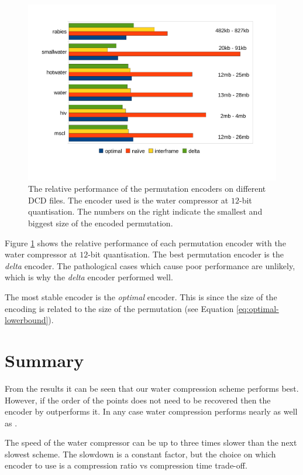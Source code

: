 \documentclass[a4paper]{report}
\begin{document}
\begin{figure}[h]
\centering
\includegraphics[trim = 10mm 30mm 10mm 18mm, clip, width=\textwidth]{images/perm}
\caption{The relative performance of the permutation encoders on different DCD
  files. The encoder used is the water compressor at $12$-bit
  quantisation. The numbers on the right indicate the smallest and biggest
  size of the encoded permutation.}
\label{fig:perm}
\end{figure}

Figure \ref{fig:perm} shows the relative performance of each permutation
encoder with the water compressor at $12$-bit quantisation. The best
permutation encoder is the \emph{delta} encoder. The pathological cases which
cause poor performance are unlikely, which is why the \emph{delta} encoder
performed well.

The most stable encoder is the \emph{optimal} encoder. This is since the size
of the encoding is related to the size of the permutation (see Equation
\ref{eq:optimal-lowerbound}).


\section{Summary}
\label{sec:summary}

From the results it can be seen that our water compression scheme performs
best. However, if the order of the points does not need to be recovered then
the encoder by \citet{gumholdcomp} outperforms it. In any case water
compression performs nearly as well as \citet{gumholdcomp}.

The speed of the water compressor can be up to three times slower than the
next slowest scheme. The slowdown is a constant factor, but the choice on
which encoder to use is a compression ratio vs compression time trade-off.
\end{document}
